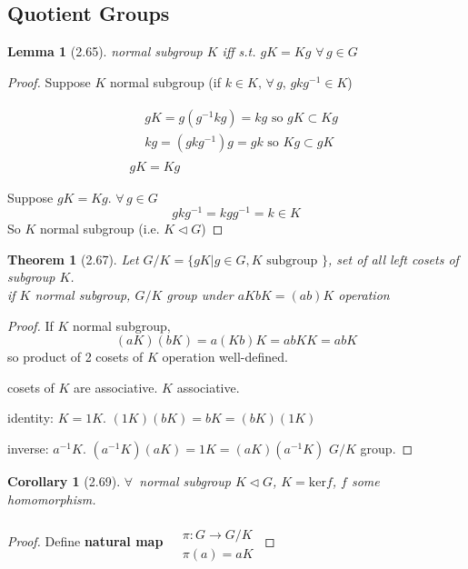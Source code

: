 \documentclass[twoside,landscape]{amsart}
\theoremstyle{plain}
\newtheorem{theorem}{Theorem}
\newtheorem{lemma}{Lemma}
\newtheorem{corollary}{Corollary}
\theoremstyle{definition}
\theoremstyle{remark}
\begin{document}
\begin{multicols*}{2}
\subsection{Quotient Groups }

\begin{lemma}[2.65] normal subgroup $K$ iff s.t. $gK = Kg$ \quad $\forall \, g \in G$ \end{lemma} 

\begin{proof} Suppose $K$ normal subgroup (if $k\in K, \, \forall \, g$, $gk g^{-1} \in K$)

\[
\begin{gathered}
  \begin{aligned}
    & gK = g(g^{-1} k g) = kg \text{ so } gK \subset Kg \\ 
    & kg = (gkg^{-1})g = gk \text{ so } Kg \subset gK 
\end{aligned} \\
gK = Kg 
\end{gathered}
\]


Suppose $gK = Kg$.  $\forall \, g \in G$ 
\[
gkg^{-1} = kgg^{-1} = k \in K 
\]
So $K$ normal subgroup (i.e. $K \lhd G$)


\end{proof}

\begin{theorem}[2.67] Let $G/K = \lbrace gK  | g\in G, K \text{ subgroup }\rbrace$, set of all left cosets of subgroup $K$.   \\
if $K$ normal subgroup, $G/K$ group under $aK bK = (ab) K$ operation \end{theorem}

\begin{proof}
If $K$ normal subgroup, 
\[
(aK) (bK) = a(Kb)K = abKK = abK
\]
so product of 2 cosets of $K$ operation well-defined.  

cosets of $K$ are associative.  $K$ associative.  

identity: $K=1K$.  $(1K)(bK) = bK = (bK)(1K)$

inverse: $a^{-1} K$.  $(a^{-1}K)(aK) = 1 K = (aK)(a^{-1}K)$ $G/K$ group.  

\end{proof}


\begin{corollary}[2.69] $\forall \, $ normal subgroup $K \lhd G$, $K = \text{ker}{f}$, $f$ some homomorphism.  \end{corollary}

\begin{proof} Define \textbf{natural map} $\begin{aligned} & \quad \\ & \pi : G \to G/K \\ & \pi(a) = aK \end{aligned}$


\end{proof}
\end{multicols*}
\end{document}
